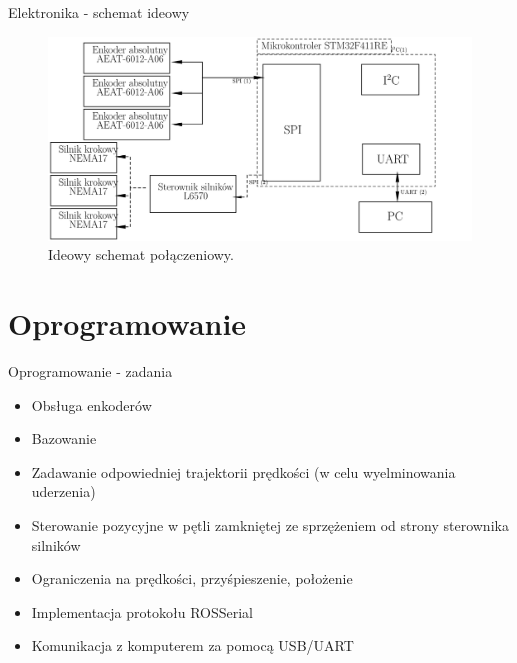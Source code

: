 \documentclass{beamer}
\begin{document}
\begin{frame}{Elektronika - schemat ideowy}
	
	\begin{figure}[h]
		\centering
		\includegraphics[height=0.6\textheight]{img/core_agent_hardware_schematics-1.png}
		\caption{Ideowy schemat połączeniowy.}
		\label{ros:schemat-elektronika}
	\end{figure}
	
\end{frame}

\section{Oprogramowanie}

\begin{frame}{Oprogramowanie - zadania}
	\begin{itemize}
		\item {
			Obsługa enkoderów
		}
		\item {
			Bazowanie
		}
		\item {
			Zadawanie odpowiedniej trajektorii prędkości (w celu wyelminowania uderzenia)
		}
		\item {
			Sterowanie pozycyjne w pętli zamkniętej ze sprzężeniem od strony sterownika silników
		}
		\item{
			Ograniczenia na prędkości, przyśpieszenie, położenie
		}
		\item{
			Implementacja protokołu ROSSerial		}
		\item{
			Komunikacja z komputerem za pomocą USB/UART
		}
	\end{itemize}
\end{frame}
\end{document}
